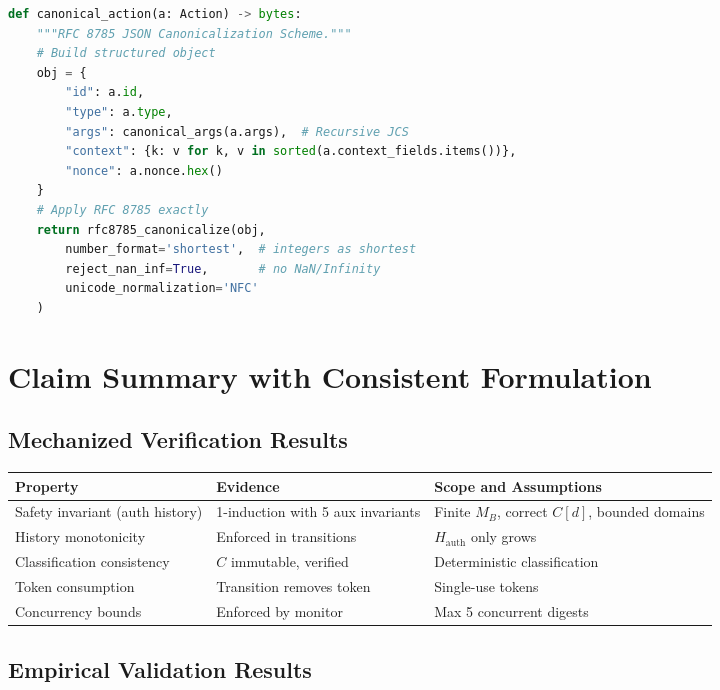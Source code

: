 \documentclass[12pt]{article}
\begin{document}
\begin{lstlisting}[language=Python,basicstyle=\scriptsize]
def canonical_action(a: Action) -> bytes:
    """RFC 8785 JSON Canonicalization Scheme."""
    # Build structured object
    obj = {
        "id": a.id,
        "type": a.type,
        "args": canonical_args(a.args),  # Recursive JCS
        "context": {k: v for k, v in sorted(a.context_fields.items())},
        "nonce": a.nonce.hex()
    }
    # Apply RFC 8785 exactly
    return rfc8785_canonicalize(obj, 
        number_format='shortest',  # integers as shortest
        reject_nan_inf=True,       # no NaN/Infinity
        unicode_normalization='NFC'
    )
\end{lstlisting}

\section{Claim Summary with Consistent Formulation}

\subsection{Mechanized Verification Results}

\begin{center}
\small
\begin{tabular}{@{}p{}p{}p{}@{}}
\toprule
\textbf{Property} & \textbf{Evidence} & \textbf{Scope and Assumptions} \\
\midrule
Safety invariant (auth history) & 1-induction with 5 aux invariants & Finite $M_B$, correct $C[d]$, bounded domains \\
History monotonicity & Enforced in transitions & $H_{\text{auth}}$ only grows \\
Classification consistency & $C$ immutable, verified & Deterministic classification \\
Token consumption & Transition removes token & Single-use tokens \\
Concurrency bounds & Enforced by monitor & Max 5 concurrent digests \\
\bottomrule
\end{tabular}
\end{center}

\subsection{Empirical Validation Results}
\end{document}
